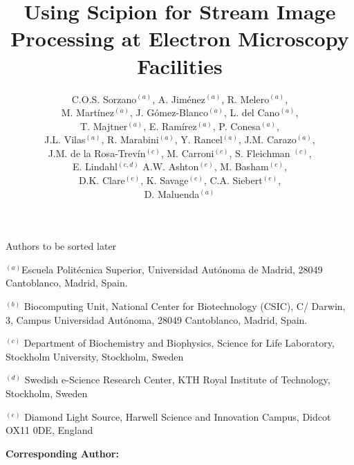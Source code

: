 \documentclass[12pt]{article}
\newcommand{\lyxaddress}[1]{
   \par {\raggedright #1
   \vspace{1.4em}
   \noindent\par}
}
\begin{document}
\title{Using Scipion for Stream Image Processing at Electron Microscopy Facilities}
Authors to be sorted later
\author{C.O.S. Sorzano$^{(a)}$,
A. Jim\'{e}nez$^{(a)}$,
R. Melero$^{(a)}$,\\
M. Mart\'{i}nez$^{(a)}$,
J. G\'{o}mez-Blanco$^{(a)}$,
L. del Cano$^{(a)}$,\\
T. Majtner$^{(a)}$,
E. Ram\'{i}rez$^{(a)}$,
P. Conesa$^{(a)}$,\\
J.L. Vilas$^{(a)}$,
R. Marabini$^{(a)}$,
Y. Rancel$^{(a)}$,
J.M. Carazo$^{(a)}$,\\
J.M. de la Rosa-Trev\'{i}n$^{(c)}$,
M. Carroni$^{(c)}$,
S. Fleichman $^{(c)}$,\\
E. Lindahl$^{(c,d)}$
A.W. Ashton$^{(e)}$,
M. Basham$^{(e)}$,\\
D.K. Clare$^{(e)}$,
K. Savage$^{(e)}$,
C.A. Siebert$^{(e)}$,\\
D. Maluenda$^{(a)}$
        }

\maketitle

\lyxaddress{{\small \vspace{-0.5cm}$^{(a)}$Escuela Polit\'{e}cnica Superior, Universidad Aut\'{o}noma de Madrid, 28049 Cantoblanco, Madrid, Spain.}}
\lyxaddress{{\small$^{(b)}$ Biocomputing Unit, National Center for Biotechnology (CSIC), C/ Darwin, 3, Campus Universidad Aut\'{o}noma, 28049 Cantoblanco, Madrid, Spain.}}
\lyxaddress{{\small$^{(c)}$ Department of Biochemistry and Biophysics, Science for Life Laboratory, Stockholm University, Stockholm, Sweden}} 
\lyxaddress{{\small$^{(d)}$ Swedish e-Science Research Center, KTH Royal Institute of Technology, Stockholm, Sweden}}
\lyxaddress{{\small$^{(e)}$ Diamond Light Source, Harwell Science and Innovation Campus, Didcot OX11 0DE, England}}
\setcounter{figure}{2}%
\textbf{Corresponding Author:} %

\newpage







\appendix




\clearpage
%

\newpage
%
%
\end{document}
